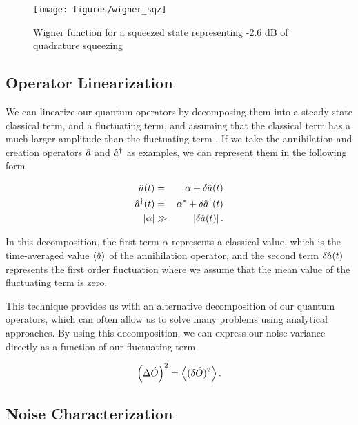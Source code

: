 \begin{figure}[!ht] 
 \centering 
 \texttt{[image: figures/wigner\_sqz]} 
 \caption[Wigner of Squeezed State]{Wigner function for a squeezed state
 representing -2.6 dB of quadrature squeezing} 
 \label{fig:wigner_sqz} 
\end{figure}

\subsection{Operator Linearization}  
\label{sec:linearization}

We can linearize our quantum operators by decomposing them into a steady-state classical term, and a fluctuating term, and assuming that the classical term has a much larger amplitude than the fluctuating term \cite{Fabre90}.  If we take the annihilation and creation operators $ \hat{a}$ and $\hat{a}^\dagger$ as examples, we can represent them in the following form

\begin{eqnarray}
  \label{eq:linearized}
  \hat{a}(t)  & = &  \alpha + \delta \hat{a}(t) \\
  \hat{a}^\dagger(t) & = & \alpha^* + \delta \hat{a}^\dagger(t) \\
  \left| \alpha \right| & \gg & \left| \delta \hat{a}(t) \right|.
\end{eqnarray}

In this decomposition, the first term $\alpha$ represents a classical value, which is the time-averaged value $\left< \hat{a} \right>$ of the annihilation operator, and the second term $\delta \hat{a}(t)$ represents the first order fluctuation where we assume that the mean value of the fluctuating term is zero.

This technique provides us with an alternative decomposition of our quantum operators, which can often allow us to solve many problems using analytical approaches.  By using this decomposition, we can express our noise variance directly as a function of our fluctuating term

\begin{equation}
  \label{eq:noise_fluctuation}
  \left(\Delta \hat{O} \right)^2 = \left< (\delta \hat{O})^2 \right>.
\end{equation}

\subsection{Noise Characterization} 
\label{noise_characterization} 


